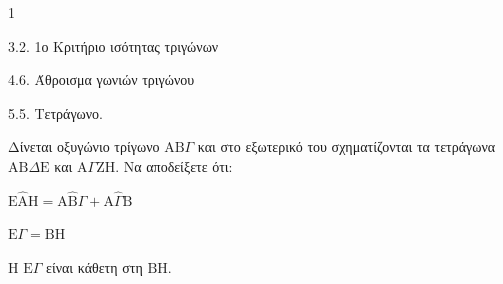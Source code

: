 \begin{ylh}{1}
    \item 3.2. 1ο Κριτήριο ισότητας τριγώνων
    \item 4.6. Άθροισμα γωνιών τριγώνου
    \item 5.5. Τετράγωνο.
\end{ylh}
Δίνεται οξυγώνιο τρίγωνο $\mathrm{A}\mathrm{B}\Gamma$ και στο εξωτερικό του σχηματίζονται τα τετράγωνα $\mathrm{A}\mathrm{B}\Delta\mathrm{E}$ και $\mathrm{A}\Gamma\mathrm{Z}\mathrm{H}$.
Να αποδείξετε ότι:
\begin{alist}
    \item $\mathrm{E}\hat{\mathrm{A}}\mathrm{H} = \mathrm{A}\hat{\mathrm{B}}\Gamma + \mathrm{A}\hat{\Gamma}\mathrm{B}$ 
    \item $\mathrm{E}\Gamma = \mathrm{B}\mathrm{H}$ 
    \item Η $\mathrm{E}\Gamma$ είναι κάθετη στη $\mathrm{B}\mathrm{H}$. 
\end{alist}
